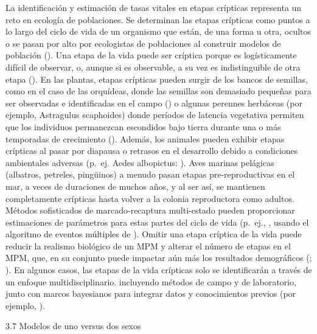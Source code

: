 \documentclass[
]{book}
\theoremstyle{definition}
\theoremstyle{definition}
\theoremstyle{definition}
\theoremstyle{definition}
\theoremstyle{remark}
\begin{document}
La identificación y estimación de tasas vitales en etapas crípticas representa un reto en ecología de poblaciones. Se determinan las etapas crípticas como puntos a lo largo del ciclo de vida de un organismo que están, de una forma u otra, ocultos o se pasan por alto por ecologistas de poblaciones al construir modelos de población (\citet{doak2002population}). Una etapa de la vida puede ser críptica porque es logísticamente difícil de observar, o, aunque si es observable, a su vez es indistinguible de otra etapa (\citet{nguyen2019consequences}). En las plantas, etapas crípticas pueden surgir de los bancos de semillas, como en el caso de las orquídeas, donde las semillas son demasiado pequeñas para ser observadas e identificadas en el campo (\citet{paniw2017accounting}) o algunas perennes herbáceas (por ejemplo, Astragulus scaphoides) donde períodos de latencia vegetativa permiten que los individuos permanezcan escondidos bajo tierra durante una o más temporadas de crecimiento (\citet{gremer2013risky}). Además, los animales pueden exhibir etapas crípticas al pasar por diapausa o retrasos en el desarrollo debido a condiciones ambientales adversas (p.~ej. Aedes albopictus: \citet{jia2016climate}). Aves marinas pelágicas (albatros, petreles, pingüinos) a menudo pasan etapas pre-reproductivas en el mar, a veces de duraciones de muchos años, y al ser así, se mantienen completamente crípticas hasta volver a la colonia reproductora como adultos. Métodos sofisticados de marcado-recaptura multi-estado pueden proporcionar estimaciones de parámetros para estas partes del ciclo de vida (p.~ej., \citet{jenouvrier2018interacting}, usando el algoritmo de eventos múltiples de \citet{choquet2009program}). Omitir una etapa críptica de la vida puede reducir la realismo biológico de un MPM y alterar el número de etapas en el MPM, que, en su conjunto puede impactar aún más los resultados demográficos (\citet{salguero2010matrix}; \citet{tenhumberg2009model}). En algunos casos, las etapas de la vida crípticas solo se identificarán a través de un enfoque multidisciplinario. incluyendo métodos de campo y de laboratorio, junto con marcos bayesianos para integrar datos y conocimientos previos (por ejemplo, \citet{paniw2017accounting}).

3.7 \textbar{} Modelos de uno versus dos sexos
\end{document}
